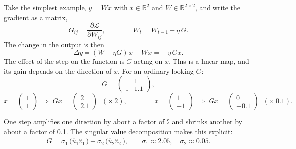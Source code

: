 \documentclass[11pt]{article}
\newcommand{\R}{\mathbb{R}}
\newcommand{\Loss}{\mathcal{L}}
\begin{document}
Take the simplest example, $y = Wx$ with $x \in \R^{2}$ and $W \in \R^{2\times 2}$, and
write the gradient as a matrix,
%
\[
  G_{ij} = \frac{\partial \Loss}{\partial W_{ij}},
  \qquad\qquad
  W_{t} = W_{t-1} - \eta\, G .
\]
%
The change in the output is then
%
\[
  \Delta y = (W - \eta G)\,x - W x = -\,\eta\, \underline{G x}.
\]
%
The effect of the step on the function is $G$ acting on $x$. This is a linear map, and
its gain depends on the direction of $x$. For an ordinary-looking $G$:
%
\[
  G = \begin{pmatrix} 1 & 1 \\ 1 & 1.1 \end{pmatrix},
\]
\[
  x = \begin{pmatrix} 1 \\ 1 \end{pmatrix}
  \;\Rightarrow\;
  Gx = \begin{pmatrix} 2 \\ 2.1 \end{pmatrix} \;\;(\times\, 2),
  \qquad\qquad
  x = \begin{pmatrix} 1 \\ -1 \end{pmatrix}
  \;\Rightarrow\;
  Gx = \begin{pmatrix} 0 \\ -0.1 \end{pmatrix} \;\;(\times\, 0.1).
\]

\noindent
One step amplifies one direction by about a factor of 2 and shrinks another by about a
factor of 0.1. The singular value decomposition makes this explicit:
%
\[
  G = \sigma_{1}\,\big(\hat{u}_{1} \hat{v}_{1}^{\top}\big)
    + \sigma_{2}\,\big(\hat{u}_{2} \hat{v}_{2}^{\top}\big),
  \qquad
  \sigma_{1} \approx 2.05, \quad \sigma_{2} \approx 0.05 .
\]

\begin{center}
\end{center}
\end{document}
